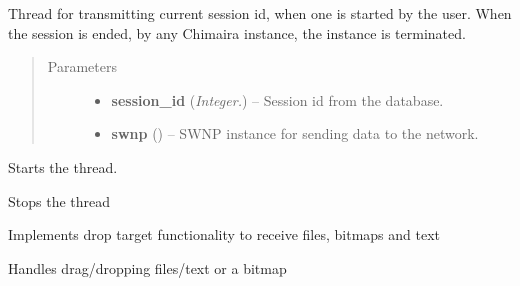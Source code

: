 \documentclass[letterpaper,10pt,english]{sphinxmanual}
\begin{document}
\begin{fulllineitems}
\label{api:wos.CURRENT_SESSION}
Thread for transmitting current session id, when one is started by the user.  When the session is ended, by any Chimaira instance, the instance is terminated.
\begin{quote}\begin{description}
\item[{Parameters}] \leavevmode\begin{itemize}
\item {} 
\textbf{session\_id} (\emph{Integer.}) -- Session id from the database.

\item {} 
\textbf{swnp} ({\hyperref[api:swnp.SWNP]{}}) -- SWNP instance for sending data to the network.

\end{itemize}

\end{description}\end{quote}

\begin{fulllineitems}
\label{api:wos.CURRENT_SESSION.run}
Starts the thread.

\end{fulllineitems}


\begin{fulllineitems}
\label{api:wos.CURRENT_SESSION.stop}
Stops the thread

\end{fulllineitems}


\end{fulllineitems}


\begin{fulllineitems}
\label{api:wos.DropTarget}
Implements drop target functionality to receive files, bitmaps and text

\begin{fulllineitems}
\label{api:wos.DropTarget.OnData}
Handles drag/dropping files/text or a bitmap

\end{fulllineitems}


\end{fulllineitems}
\end{document}
